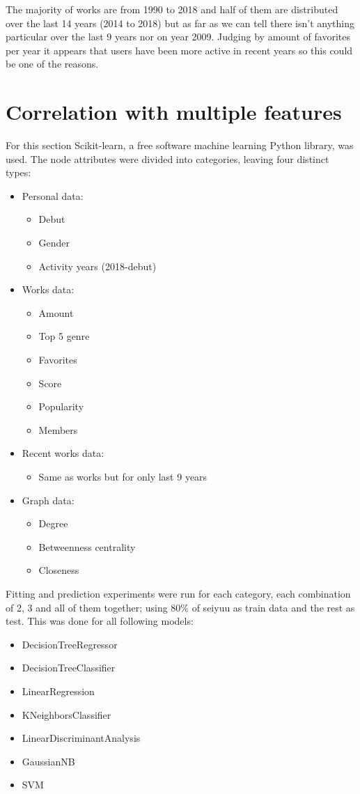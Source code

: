 The majority of works are from 1990 to 2018 and half of them are distributed over the last 14 years (2014 to 2018) but as far as we can tell there isn’t anything particular over the last 9 years nor on year 2009. Judging by amount of favorites per year it appears that users have been more active in recent years so this could be one of the reasons.

\section{Correlation with multiple features}
For this section Scikit-learn, a free software machine learning Python library, was used. The node attributes were divided into categories, leaving four distinct types:

\begin{itemize}
	\item Personal data:
	\begin{itemize}
		\item Debut
		\item Gender
		\item Activity years (2018-debut)
	\end{itemize}
	\item Works data:
	\begin{itemize}
		\item Amount
		\item Top 5 genre
		\item Favorites
		\item Score
		\item Popularity
		\item Members
	\end{itemize}
	\item Recent works data:
	\begin{itemize}
		\item Same as works but for only last 9 years
	\end{itemize}	
	\item Graph data:
	\begin{itemize}
		\item Degree
		\item Betweenness centrality
		\item Closeness
	\end{itemize}
\end{itemize}

Fitting and prediction experiments were run for each category, each combination of 2, 3 and all of them together; using 80\% of seiyuu as train data and the rest as test. This was done for all following models:
\begin{itemize}
	\item DecisionTreeRegressor
	\item DecisionTreeClassifier
	\item LinearRegression
	\item KNeighborsClassifier
	\item LinearDiscriminantAnalysis
	\item GaussianNB
	\item SVM
\end{itemize}

